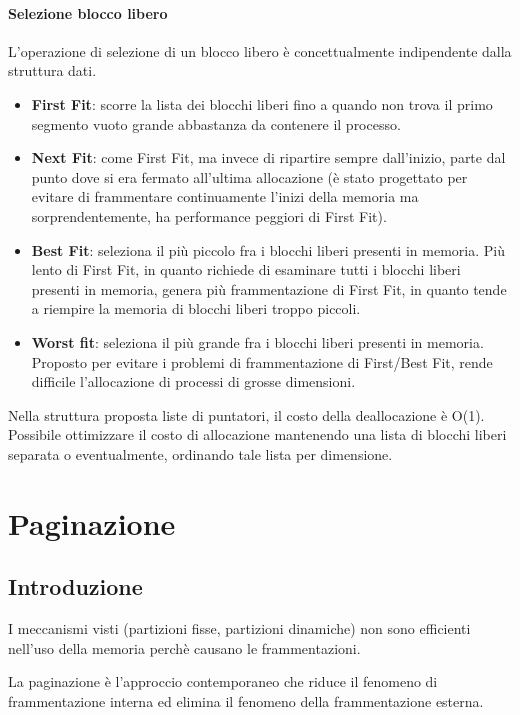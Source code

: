 \paragraph{Selezione blocco libero}
L'operazione di selezione di un blocco libero è concettualmente
indipendente dalla struttura dati.
\begin{itemize}
    \item \textbf{First Fit}: scorre la lista dei blocchi liberi fino a quando non trova il primo segmento vuoto grande abbastanza da contenere il processo.
    \item \textbf{Next Fit}: come First Fit, ma invece di ripartire sempre dall'inizio, parte dal punto dove si era fermato all'ultima allocazione (è stato progettato per evitare di frammentare continuamente l'inizi della memoria ma sorprendentemente, ha performance peggiori di First Fit).
    \item \textbf{Best Fit}: seleziona il più piccolo fra i blocchi liberi presenti in memoria. Più lento di First Fit, in quanto richiede di esaminare tutti i blocchi liberi presenti in memoria, genera più frammentazione di First Fit, in quanto tende a riempire la memoria di blocchi liberi troppo piccoli.
    \item \textbf{Worst fit}: seleziona il più grande fra i blocchi liberi presenti in memoria. Proposto per evitare i problemi di frammentazione di First/Best Fit, rende difficile l'allocazione di processi di grosse dimensioni.
\end{itemize}

Nella struttura proposta liste di puntatori, il costo della deallocazione è O(1).
Possibile ottimizzare il costo di allocazione mantenendo una lista di blocchi liberi separata o eventualmente, ordinando tale lista per dimensione.

\newpage


\section{Paginazione}
\subsection{Introduzione}
I meccanismi visti (partizioni fisse, partizioni dinamiche) non sono efficienti nell'uso della memoria perchè causano le frammentazioni.

La paginazione è l'approccio contemporaneo che riduce il fenomeno di frammentazione interna ed elimina il fenomeno della frammentazione esterna.

